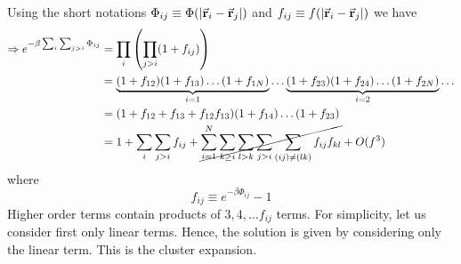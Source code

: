 \documentclass[../../Main/Main.tex]{subfiles}
\begin{document}
 Using the short notations \(   \Phi _{ij} \equiv \Phi (\abs{\va{r}_i - \va{r}_j} ) \) and \( f_{ij} \equiv f (\abs{\va{r}_i - \va{r}_j} ) \) we have
\begin{equation*}
\begin{split}
  \Rightarrow e^{-\beta \sum_{i}^{}  \sum_{j>i}^{} \Phi _{ij}  } &= \prod_{i}^{} \qty(\prod_{j>i}^{} (1+ f_{ij})  ) \\
  & = \underbrace{(1+f_{12})(1+f_{13})  \dots ( 1 + f_{1N })}_{i=1}   \dots \underbrace{(1+f_{23}) (1+ f_{24}) \dots ( 1 + f_{2N })}_{i=2} \dots \\
  & = (1 + f_{12} + f_{13} + f_{12}f_{13}) (1+f_{14}) \dots(1+f_{23}) \\
  & = 1 + \sum_{i}^{} \sum_{j>i}^{} f_{ij} + \cancel{\sum_{i=1}^{N} \sum_{k \ge i}^{} \sum_{l > k}^{} \sum_{j > i }^{} \sum_{(ij) \neq (lk)}^{}  f_{ij} f_{kl}       } + O (f^3)
\end{split}
\end{equation*}
where
\begin{equation*}
  f_{ij} \equiv  e^{-\beta \Phi _{ij}} -1
\end{equation*}
Higher order terms contain products of \( 3,4,\dots f_{ij} \) terms. For simplicity, let us consider first only linear terms. Hence, the solution is given by considering only the linear term. This is the cluster expansion.
\end{document}
